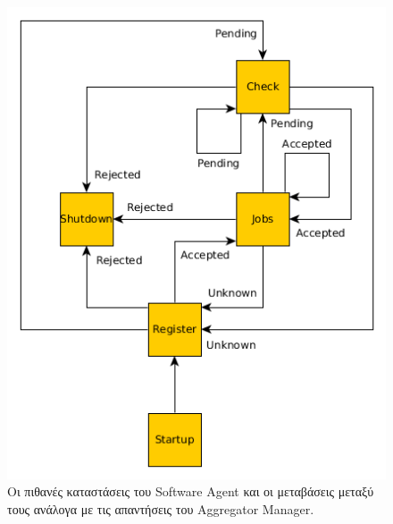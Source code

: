 \documentclass[a4paper,11pt]{article}
\begin{document}
\begin{sloppypar}
\begin{figure}[h]
\includegraphics[width=\textwidth]{sa-states}
\centering
\caption{Οι πιθανές καταστάσεις του Software Agent και οι μεταβάσεις μεταξύ τους ανάλογα με τις απαντήσεις του Aggregator Manager.}
\end{figure}


\end{sloppypar}
\end{document}
